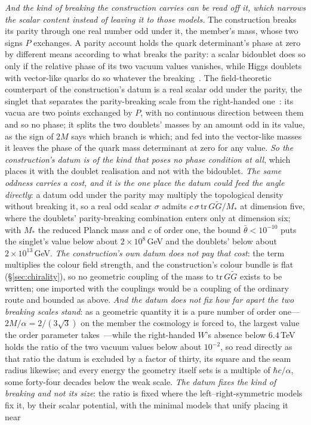 \documentclass[11pt]{article}
\begin{document}
\emph{And the kind of breaking the construction carries can be read off it, which narrows the scalar content instead of leaving it to those models.} The construction breaks its parity through one real number odd under it, the member's mass, whose two signs $P$ exchanges. A parity account holds the quark determinant's phase at zero by different means according to what breaks the parity: a scalar bidoublet does so only if the relative phase of its two vacuum values vanishes, while Higgs doublets with vector-like quarks do so whatever the breaking~\cite{BabuMohapatra1990}. The field-theoretic counterpart of the construction's datum is a real scalar odd under the parity, the singlet that separates the parity-breaking scale from the right-handed one~\cite{ChangMohapatraParida1984}: its vacua are two points exchanged by $P$, with no continuous direction between them and so no phase; it splits the two doublets' masses by an amount odd in its value, as the sign of $2M$ says which branch is which; and fed into the vector-like masses it leaves the phase of the quark mass determinant at zero for any value. \emph{So the construction's datum is of the kind that poses no phase condition at all}, which places it with the doublet realisation and not with the bidoublet. \emph{The same oddness carries a cost, and it is the one place the datum could feed the angle directly}: a datum odd under the parity may multiply the topological density without breaking it, so a real odd scalar $\sigma$ admits $c\,\sigma\,\mathrm{tr}\,G\tilde G/M_{*}$ at dimension five, where the doublets' parity-breaking combination enters only at dimension six; with $M_{*}$ the reduced Planck mass and $c$ of order one, the bound $\bar\theta<10^{-10}$ puts the singlet's value below about $2\times10^{8}$\,GeV and the doublets' below about $2\times10^{13}$\,GeV. \emph{The construction's own datum does not pay that cost}: the term multiplies the colour field strength, and the construction's colour bundle is flat (\S\ref{sec:chirality}), so no geometric coupling of the mass to $\mathrm{tr}\,G\tilde G$ exists to be written; one imported with the couplings would be a coupling of the ordinary route and bounded as above. \emph{And the datum does not fix how far apart the two breaking scales stand}: as a geometric quantity it is a pure number of order one---$2M/\alpha=2/(3\sqrt3)$ on the member the cosmology is forced to, the largest value the order parameter takes~\cite{JanzenGeometricCore}---while the right-handed $W$'s absence below $6.4$\,TeV~\cite{ATLAS2023WR} holds the ratio of the two vacuum values below about $10^{-2}$, so read directly as that ratio the datum is excluded by a factor of thirty, its square and the seam radius likewise; and every energy the geometry itself sets is a multiple of $\hbar c/\alpha$, some forty-four decades below the weak scale. \emph{The datum fixes the kind of breaking and not its size}: the ratio is fixed where the left--right-symmetric models fix it, by their scalar potential, with the minimal models that unify placing it near 
\end{document}
